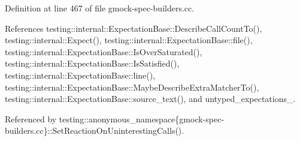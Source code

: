 Definition at line 467 of file gmock-\/spec-\/builders.\+cc.



References testing\+::internal\+::\+Expectation\+Base\+::\+Describe\+Call\+Count\+To(), testing\+::internal\+::\+Expect(), testing\+::internal\+::\+Expectation\+Base\+::file(), testing\+::internal\+::\+Expectation\+Base\+::\+Is\+Over\+Saturated(), testing\+::internal\+::\+Expectation\+Base\+::\+Is\+Satisfied(), testing\+::internal\+::\+Expectation\+Base\+::line(), testing\+::internal\+::\+Expectation\+Base\+::\+Maybe\+Describe\+Extra\+Matcher\+To(), testing\+::internal\+::\+Expectation\+Base\+::source\+\_\+text(), and untyped\+\_\+expectations\+\_\+.



Referenced by testing\+::anonymous\+\_\+namespace\{gmock-\/spec-\/builders.\+cc\}\+::\+Set\+Reaction\+On\+Uninteresting\+Calls().


